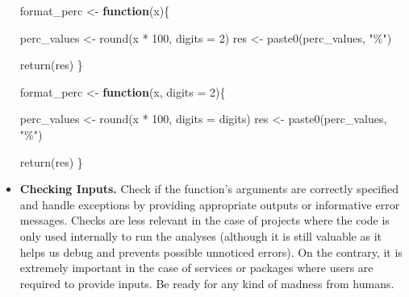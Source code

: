 \documentclass[
  11pt,
]{book}
\newenvironment{Shaded}{\begin{snugshade}}{\end{snugshade}}
\newcommand{\AttributeTok}[1]{\textcolor[rgb]{0.77,0.63,0.00}{#1}}
\newcommand{\ControlFlowTok}[1]{\textcolor[rgb]{0.13,0.29,0.53}{\textbf{#1}}}
\newcommand{\DecValTok}[1]{\textcolor[rgb]{0.00,0.00,0.81}{#1}}
\newcommand{\FunctionTok}[1]{\textcolor[rgb]{0.00,0.00,0.00}{#1}}
\newcommand{\NormalTok}[1]{#1}
\newcommand{\OtherTok}[1]{\textcolor[rgb]{0.56,0.35,0.01}{#1}}
\newcommand{\SpecialCharTok}[1]{\textcolor[rgb]{0.00,0.00,0.00}{#1}}
\newcommand{\StringTok}[1]{\textcolor[rgb]{0.31,0.60,0.02}{#1}}
\newenvironment{code-tex-bad}
  {\begingroup\definecolor{shadecolor}{RGB}{255, 189, 185}}
  {\endgroup}
\newenvironment{code-tex-good}
  {\begingroup\definecolor{shadecolor}{RGB}{224, 240, 227}}
  {\endgroup}
\begin{document}
\begin{itemize}
  \begin{code-tex-bad}

\begin{Shaded}
\begin{Highlighting}[]
\NormalTok{format\_perc }\OtherTok{\textless{}{-}} \ControlFlowTok{function}\NormalTok{(x)\{}

\NormalTok{  perc\_values }\OtherTok{\textless{}{-}} \FunctionTok{round}\NormalTok{(x }\SpecialCharTok{*} \DecValTok{100}\NormalTok{, }\AttributeTok{digits =} \DecValTok{2}\NormalTok{)}
\NormalTok{  res }\OtherTok{\textless{}{-}} \FunctionTok{paste0}\NormalTok{(perc\_values, }\StringTok{"\%"}\NormalTok{)}

  \FunctionTok{return}\NormalTok{(res)}
\NormalTok{\}}
\end{Highlighting}
\end{Shaded}

  \end{code-tex-bad}

  \begin{code-tex-good}

\begin{Shaded}
\begin{Highlighting}[]
\NormalTok{format\_perc }\OtherTok{\textless{}{-}} \ControlFlowTok{function}\NormalTok{(x, }\AttributeTok{digits =} \DecValTok{2}\NormalTok{)\{}

\NormalTok{  perc\_values }\OtherTok{\textless{}{-}} \FunctionTok{round}\NormalTok{(x }\SpecialCharTok{*} \DecValTok{100}\NormalTok{, }\AttributeTok{digits =}\NormalTok{ digits)}
\NormalTok{  res }\OtherTok{\textless{}{-}} \FunctionTok{paste0}\NormalTok{(perc\_values, }\StringTok{"\%"}\NormalTok{)}

  \FunctionTok{return}\NormalTok{(res)}
\NormalTok{\}}
\end{Highlighting}
\end{Shaded}

  \end{code-tex-good}
\item
  \textbf{Checking Inputs.} Check if the function's arguments are correctly specified and handle exceptions by providing appropriate outputs or informative error messages. Checks are less relevant in the case of projects where the code is only used internally to run the analyses (although it is still valuable as it helps us debug and prevents possible unnoticed errors). On the contrary, it is extremely important in the case of services or packages where users are required to provide inputs. Be ready for any kind of madness from humans.


\end{itemize}
\end{document}
